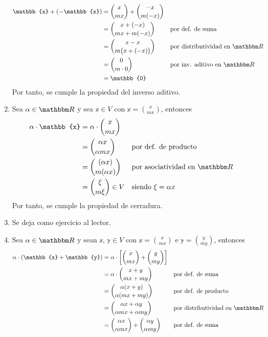 \begin{example}
\begin{enumerate}[label=\roman*)]
        \begin{align*}
            \mathbb{x} + (-\mathbb{x}) & = \binom{x}{mx} + \binom{-x}{m(-x)} \\
            & = \binom{x+(-x)}{mx+m(-x)} && \text{por def. de suma} \\
            & = \binom{x-x}{m\big(x+(-x)\big)} && \text{por distributividad en $\RR$} \\
            & = \binom{0}{m \cdot 0} && \text{por inv. aditivo en $\RR$} \\
            & = \mathbb{0}
        \end{align*}
        Por tanto, se cumple la propiedad del inverso aditivo.
        \item Sea $\alpha \in \RR$ y sea $\mathbb{x} \in V$ con $\displaystyle \mathbb{x} = \binom{x}{mx}$, entonces
        \begin{align*}
            \alpha \cdot \mathbb{x} & = \alpha \cdot \binom{x}{mx} \\
            & = \binom{\alpha x}{\alpha mx} && \text{por def. de producto} \\
            & = \binom{(\alpha x)}{m(\alpha x)} && \text{por asociatividad en $\RR$} \\
            & = \binom{\xi}{m\xi} \in V && \text{siendo $\xi = \alpha x$}
        \end{align*}
        Por tanto, se cumple la propiedad de cerradura.
        \item Se deja como ejercicio al lector.
        \item Sea $\alpha \in \RR$ y sean $\mathbb{x}$, $\mathbb{y} \in V$ con $\displaystyle \mathbb{x} = \binom{x}{mx}$ e $\displaystyle \mathbb{y} = \binom{y}{my}$, entonces
        \begin{align*}
            \alpha \cdot (\mathbb{x} + \mathbb{y}) & = \alpha \cdot \left[ \binom{x}{mx} + \binom{y}{my} \right] \\
            & = \alpha \cdot \binom{x+y}{mx+my} && \text{por def. de suma} \\
            & = \binom{\alpha (x+y)}{\alpha (mx+my)} && \text{por def. de producto} \\
            & = \binom{\alpha x + \alpha y}{\alpha mx + \alpha my} && \text{por distributividad en $\RR$} \\
            & = \binom{\alpha x}{\alpha mx} + \binom{\alpha y}{\alpha my} && \text{por def. de suma} \\

\end{align*}
\end{enumerate}
\end{example}
